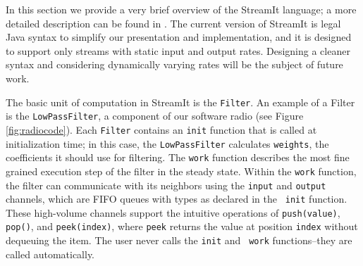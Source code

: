 In this section we provide a very brief overview of the StreamIt
language; a more detailed description can be found in
\cite{streamitcc}.  The current version of StreamIt is legal Java
syntax to simplify our presentation and implementation, and it is
designed to support only streams with static input and output rates.
Designing a cleaner syntax and considering dynamically varying rates
will be the subject of future work.

The basic unit of computation in StreamIt is the {\tt Filter}.  An
example of a Filter is the {\tt LowPassFilter}, a component of our
software radio (see Figure \ref{fig:radiocode}).  Each {\tt Filter}
contains an {\tt init} function that is called at initialization time;
in this case, the {\tt LowPassFilter} calculates {\tt weights}, the
coefficients it should use for filtering.  The {\tt work} function
describes the most fine grained execution step of the filter in the
steady state.  Within the {\tt work} function, the filter can
communicate with its neighbors using the {\tt input} and {\tt output}
channels, which are FIFO queues with types as declared in the {\tt
init} function.  These high-volume channels support the intuitive
operations of {\tt push(value)}, {\tt pop()}, and {\tt peek(index)},
where {\tt peek} returns the value at position {\tt index} without
dequeuing the item.  The user never calls the {\tt init} and {\tt
work} functions--they are called automatically.




